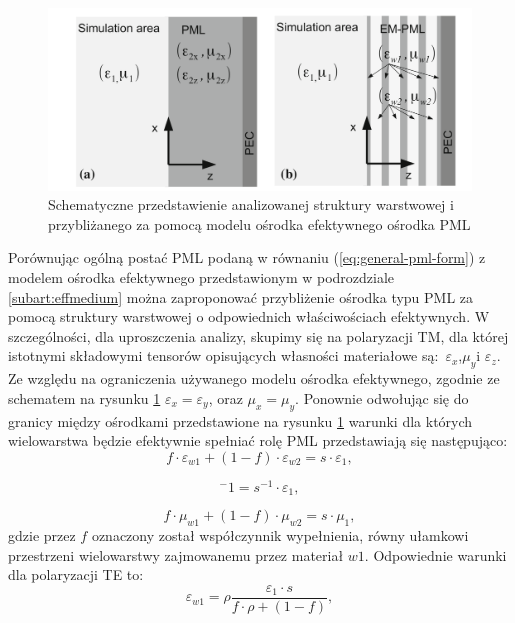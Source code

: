 \begin{figure}[tb]
	\includegraphics[width=\textwidth]{images/pml/oqe_schemat.png}
	\caption{Schematyczne przedstawienie analizowanej struktury warstwowej i przybliżanego za pomocą modelu ośrodka efektywnego ośrodka PML}
	\label{fig:pml-multilay-schem}
\end{figure}

Porównując ogólną postać PML podaną w równaniu (\ref{eq:general-pml-form}) z modelem ośrodka efektywnego przedstawionym w podrozdziale \ref{subart:effmedium} można zaproponować przybliżenie ośrodka typu PML za pomocą struktury warstwowej o odpowiednich właściwościach efektywnych. W szczególności, dla uproszczenia analizy, skupimy się na polaryzacji TM, dla której istotnymi składowymi tensorów opisujących własności materiałowe są:~$\varepsilon_x$,$\mu_y$i $\varepsilon_z$. Ze względu na ograniczenia używanego modelu ośrodka efektywnego, zgodnie ze schematem na rysunku \ref{fig:pml-multilay-schem} $\varepsilon_x=\varepsilon_y$, oraz $\mu_x=\mu_y$. Ponownie odwołując się do granicy między ośrodkami przedstawione na rysunku \ref{fig:pml-multilay-schem} warunki dla których wielowarstwa będzie efektywnie spełniać rolę PML przedstawiają się następująco:
\begin{equation}
	f\cdot \varepsilon_{w1} + (1-f)\cdot \varepsilon_{w2} = s \cdot \varepsilon_1,
	\label{eq:oqe4}
\end{equation}

\begin{equation}
	[f\cdot \varepsilon_{w1}^{-1}+(1-f)\varepsilon_{w2}^{-1}]^-1=s^{-1}\cdot \varepsilon_1,
	\label{eq:oqe5}
\end{equation}

\begin{equation}
	f\cdot \mu_{w1} + (1-f)\cdot \mu_{w2} = s \cdot \mu_1,
	\label{eq:oqe6}
\end{equation}
gdzie przez $f$ oznaczony został współczynnik wypełnienia, równy ułamkowi przestrzeni wielowarstwy zajmowanemu przez materiał $w1$. Odpowiednie warunki dla polaryzacji TE to:
\begin{equation}
	\varepsilon_{w1}=\rho \frac{\varepsilon_1 \cdot s}{f\cdot \rho + (1 -f) },
	\label{eq:te-eps1}
\end{equation}

